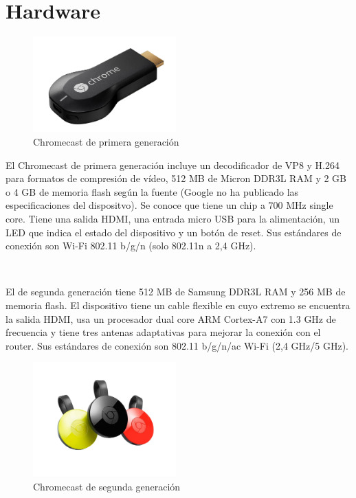 \section{Hardware}

\begin{figure}[h]
	\centering
	\includegraphics[width=0.49\textwidth]{./Imagenes/chromecast1gen.jpg}
	\caption{Chromecast de primera generación}\label{fig:1gen}
\end{figure}

El Chromecast de primera generación incluye un decodificador de VP8 y H.264 para formatos de compresión de vídeo, 512 MB de Micron DDR3L RAM y 2 GB o 4 GB de memoria flash según la fuente (Google no ha publicado las especificaciones del dispositvo).
Se conoce que tiene un chip a 700 MHz single core.
Tiene una salida HDMI, una entrada micro USB para la alimentación, un LED que indica el estado del dispositivo y un botón de reset.
Sus estándares de conexión son Wi-Fi 802.11 b/g/n (solo 802.11n a 2,4 GHz).

\

El de segunda generación tiene 512 MB de Samsung DDR3L RAM y 256 MB de memoria flash.
El dispositivo tiene un cable flexible en cuyo extremo se encuentra la salida HDMI, usa un procesador dual core ARM Cortex-A7 con 1.3 GHz de frecuencia y tiene tres antenas adaptativas para mejorar la conexión con el router.
Sus estándares de conexión son 802.11 b/g/n/ac Wi-Fi (2,4 GHz/5 GHz).

\begin{figure}[h]
	\centering
	\includegraphics[width=0.49\textwidth]{./Imagenes/Chromecast.jpg}
	\caption{Chromecast de segunda generación}\label{fig:2gen}
\end{figure}

